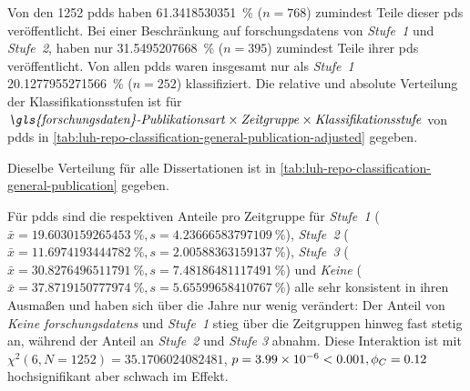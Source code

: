 Von den \num{1252} \glspl{pdd} haben \SI[round-mode=places,round-precision=2]{61.3418530351}{\percent} ($n=\num{768}$) zumindest Teile dieser \glspl{pd} veröffentlicht.
Bei einer Beschränkung auf \glspl{forschungsdaten} von \textit{Stufe~1} und \textit{Stufe~2}, haben nur \SI[round-mode=places,round-precision=2]{31.5495207668}{\percent} ($n=\num{395}$) zumindest Teile ihrer \glspl{pd} veröffentlicht.
Von allen \glspl{pdd} waren insgesamt nur als \textit{Stufe~1} \SI[round-mode=places,round-precision=2]{20.1277955271566}{\percent} ($n=252$) klassifiziert. Die relative und absolute Verteilung der Klassifikationsstufen ist für $\text{\textit{\gls{forschungsdaten}-Publikationsart}}\times\text{\textit{Zeitgruppe}}\times\text{\textit{Klassifikationsstufe}}$ von \glspl{pdd} in \cref{tab:luh-repo-classification-general-publication-adjusted} gegeben.
\begin{table}[!htbp]
	\caption{\gls{forschungsdaten}-Klassifizierung der \glspl{pdd} aus der Stichprobe nach $\text{\textit{Publikationsart}}\times\text{\textit{Klassifikationsstufe}}\times\text{\textit{Jahresgruppe}}$ aufgegliedert.
    Angaben relativ zu der Gesamtanzahl der Jahresgruppe.
    Absolute Werte in Klammern angegeben.}
    
    \label{tab:luh-repo-classification-general-publication-adjusted}
\end{table}
Dieselbe Verteilung für alle Dissertationen ist in \cref{tab:luh-repo-classification-general-publication} gegeben.

Für \glspl{pdd} sind die respektiven Anteile pro Zeitgruppe für \textit{Stufe~1} ($\bar{x}=\SI[round-mode=places,round-precision=2]{19.6030159265453}{\percent},s=\SI[round-mode=places,round-precision=2]{4.23666583797109}{\percent}$), \textit{Stufe~2} ($\bar{x}=\SI[round-mode=places,round-precision=2]{11.6974193444782}{\percent},s=\SI[round-mode=places,round-precision=2]{2.00588363159137}{\percent}$), \textit{Stufe~3} ($\bar{x}=\SI[round-mode=places,round-precision=2]{30.8276496511791}{\percent},s=\SI[round-mode=places,round-precision=2]{7.48186481117491}{\percent}$) und \textit{Keine} ($\bar{x}=\SI[round-mode=places,round-precision=2]{37.8719150777974}{\percent},s=\SI[round-mode=places,round-precision=2]{5.65599658410767}{\percent}$) alle sehr konsistent in ihren Ausmaßen und haben sich über die Jahre nur wenig verändert:
Der Anteil von \textit{Keine \glspl{forschungsdaten}} und \textit{Stufe~1} stieg über die Zeitgruppen hinweg fast stetig an, während der Anteil an \textit{Stufe~2} und \textit{Stufe 3} abnahm.
Diese Interaktion ist mit $\chi^2 (\num{6}, N = \num{1252}) = \num[round-mode=places,round-precision=2]{35.1706024082481}$, $p = \num[round-mode=places,round-precision=2]{3.99360804013405E-06}<\num{0.001},\phi_C=\num[round-mode=places,round-precision=2]{0.118514841833938}$ hochsignifikant aber schwach im Effekt.


